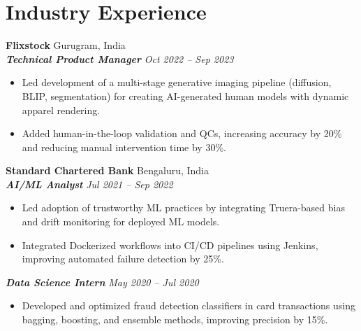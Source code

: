 \documentclass[a4paper,10pt]{article}
\begin{document}
\vspace{0.05cm}
\vspace{-0.05cm}

\section*{Industry Experience}

{\color{boldcolor}\textbf{Flixstock}} \hfill Gurugram, India\\
{\color{lightboldcolor}\textbf{\textit{Technical Product Manager}}} \hfill \textit{\small Oct 2022 -- Sep 2023}
\begin{itemize}
    \item Led development of a multi-stage generative imaging pipeline (diffusion, BLIP, segmentation) for creating AI-generated human models with dynamic apparel rendering.
    \item Added human-in-the-loop validation and QCs, increasing accuracy by 20\% and reducing manual intervention time by 30\%.
\end{itemize}
\vspace{0.05cm}

{\color{boldcolor}\textbf{Standard Chartered Bank}} \hfill Bengaluru, India \\
{\color{lightboldcolor}\textbf{\textit{AI/ML Analyst}}} \hfill \textit{\small Jul 2021 -- Sep 2022}
\begin{itemize}
    \item Led adoption of trustworthy ML practices by integrating Truera-based bias and drift monitoring for deployed ML models.
    \item Integrated Dockerized workflows into CI/CD pipelines using Jenkins, improving automated failure detection by 25\%.
\end{itemize}
\vspace{0.05cm}

{\color{lightboldcolor}\textbf{\textit{Data Science Intern}}} \hfill \textit{\small May 2020 -- Jul 2020}
\begin{itemize}
    \item Developed and optimized fraud detection classifiers in card transactions using bagging, boosting, and ensemble methods, improving precision by 15\%.
\end{itemize}
\end{document}
